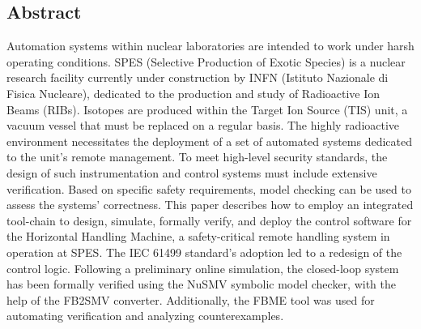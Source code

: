 \begin{bibunit}
\thispagestyle{plain}

\newcommand{\codeword}[1]{\texttt{\detokenize{#1}}}
\newcommand{\quotes}[1]{``#1''}

\setcounter{topnumber}{2}
\setcounter{bottomnumber}{2}
\setcounter{totalnumber}{4}
\renewcommand{\topfraction}{0.85}
\renewcommand{\bottomfraction}{0.65}
\renewcommand{\textfraction}{0.15}
\renewcommand{\floatpagefraction}{0.7}



\section*{Abstract}
    Automation systems within nuclear laboratories are intended to work under harsh operating conditions. SPES (Selective Production of Exotic Species) is a nuclear research facility currently under construction by INFN (Istituto Nazionale di Fisica Nucleare), dedicated to the production and study of Radioactive Ion Beams (RIBs). Isotopes are produced within the Target Ion Source (TIS) unit, a vacuum vessel that must be replaced on a regular basis. The highly radioactive environment necessitates the deployment of a set of automated systems dedicated to the unit's remote management. To meet high-level security standards, the design of such instrumentation and control systems must include extensive verification. Based on specific safety requirements, model checking can be used to assess the systems' correctness. This paper describes how to employ an integrated tool-chain to design, simulate, formally verify, and deploy the control software for the Horizontal Handling Machine, a safety-critical remote handling system in operation at SPES. The IEC 61499 standard's adoption led to a redesign of the control logic. Following a preliminary online simulation, the closed-loop system has been formally verified using the NuSMV symbolic model checker, with the help of the FB2SMV converter. Additionally, the FBME tool was used for automating verification and analyzing counterexamples.


\end{bibunit}
